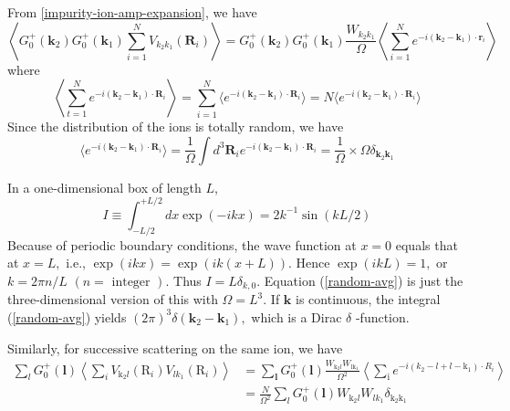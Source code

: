 From \ref{impurity-ion-amp-expansion}, we have
\begin{equation}\left\langle G_{0}^{+}\left(\mathbf{k}_{2}\right) G_{0}^{+}\left(\mathbf{k}_{1}\right) \sum_{i=1}^{N} V_{k_{2} k_{1}}\left(\mathbf{R}_{i}\right)\right\rangle=G_{0}^{+}\left(\mathbf{k}_{2}\right) G_{0}^{+}\left(\mathbf{k}_{1}\right) \frac{W_{k_{2} k_{1}}}{\Omega}\left\langle\sum_{i=1}^{N} e^{-i\left(\mathbf{k}_{2}-\mathbf{k}_{1}\right) \cdot \mathbf{r}_{i}}\right\rangle
\label{impurity-1-avg}
\end{equation}
where
\begin{equation}\left\langle\sum_{t=1}^{N} e^{-i\left(\mathbf{k}_{2}-\mathbf{k}_{1}\right) \cdot \mathbf{R}_{i}}\right\rangle=\sum_{i=1}^{N} \langle e^{-i(\mathbf{k}_{2}-\mathbf{k}_{1}) \cdot \mathbf{R}_{i}}\rangle=N\langle e^{-i(\mathbf{k}_{2}-\mathbf{k}_{1}) \cdot \mathbf{R}_{i}}\rangle
\end{equation}
Since the distribution of the ions is totally random, we have
\begin{equation}
\langle e^{-i(\mathbf{k}_{2}-\mathbf{k}_{1}) \cdot \mathbf{R}_{i}}\rangle=\frac{1}{\Omega} \int d^{3} \mathbf{R}_{i} e^{-i\left(\mathbf{k}_{2}-\mathbf{k}_{1}\right) \cdot \mathbf{R}_{i}}=\frac{1}{\Omega} \times \Omega \delta_{\mathbf{k}_{2} \mathbf{k}_{1}}
\label{random-avg}
\end{equation}
\begin{mybox}
In a one-dimensional box of length $L$,
$$I \equiv \int_{-L / 2}^{+L / 2} d x \exp (-i k x)=2 k^{-1} \sin (k L / 2)$$
Because of periodic boundary conditions, the wave function at $x=0$ equals that at $x=L,$ i.e., $\exp (i k x)=\exp (i k(x+L)) .$ Hence $\exp (i k L)=1,$ or $k=2 \pi n / L$
$(n=\text { integer }) .$ Thus $I=L \delta_{k, 0} .$ Equation (\ref{random-avg}) is just the three-dimensional version of this with $\Omega=L^3$. If $\mathbf{k}$ is continuous, the integral (\ref{random-avg}) yields $(2 \pi)^{3} \delta\left(\mathbf{k}_{2}-\mathbf{k}_{1}\right),$ which is a Dirac $\delta$ -function.
\end{mybox}
Similarly, for successive scattering on the same ion, we have
\begin{equation}
    \begin{aligned}
\sum_{l} G_{0}^{+}(\mathbf{l})\left\langle\sum_{i} V_{\mathrm{k}_{2} l}\left(\mathrm{R}_{i}\right) V_{lk_{1}}\left(\mathrm{R}_{i}\right)\right\rangle &=\sum_{\mathbf{l}} G_{0}^{+}(\mathbf{l}) \frac{W_{\mathrm{k}_{2} l} W_{\mathrm{lk_1}}}{\Omega^{2}}\left\langle\sum_{\mathrm{i}} e^{-i\left(k_{2}-l+l-\mathrm{k}_{1}\right) \cdot R_{i}}\right\rangle \\
&=\frac{N}{\Omega^{2}} \sum_{l} G_{0}^{+}(\mathbf{l}) W_{\mathrm{k}_{2} l} W_{l k_{1}} \delta_{\mathrm{k}_{2} \mathrm{k}_{1}}
\end{aligned}
\label{impurity-1st-avg}
\end{equation}
